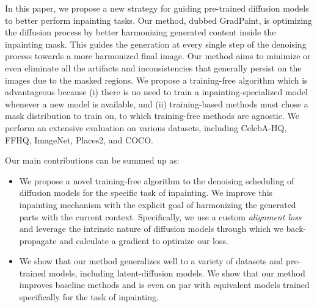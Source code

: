 In this paper, we propose a new strategy for guiding pre-trained diffusion models
to better perform inpainting tasks. Our method, dubbed GradPaint, is optimizing the
 diffusion process by better harmonizing generated content inside the inpainting mask.
  This guides the generation at every single step of the denoising process towards a
   more harmonized final image.  Our method aims to minimize or even eliminate all the 
   artifacts and inconsistencies that generally persist on the images due to the masked
    regions.
We propose a training-free algorithm which is advantageous because (i) there is no need 
to train a inpainting-specialized model whenever a new model is available, and (ii) 
training-based methods must chose a mask distribution to train on, to which training-free
 methods are agnostic. We perform an extensive evaluation on various datasets, 
 including  CelebA-HQ\cite{celebahq}, FFHQ\cite{ffhq}, ImageNet\cite{imagenet},
  Places2\cite{zhou2017places}, and COCO\cite{cocodataset}. 

Our main contributions can be summed up as:

\begin{itemize}
    \item We propose a novel training-free algorithm to the denoising scheduling of 
    diffusion models for the specific task of inpainting. We improve this inpainting
     mechanism with the explicit goal of harmonizing the generated parts with the current context. Specifically, we use a custom \textit{alignment loss} and leverage the intrinsic nature of diffusion models through which we back-propagate and calculate a gradient to optimize our loss. 

    \item We show that our method generalizes well to a variety of datasets and 
    pre-trained models, including latent-diffusion models. We show that our method 
    improves baseline methods and is even on par with equivalent models trained 
    specifically for the task of inpainting.
\end{itemize}



